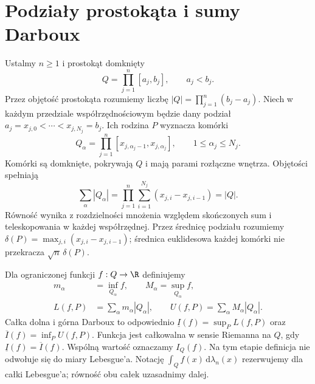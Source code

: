 \section{Podziały prostokąta i sumy Darboux}

Ustalmy $n\ge1$ i prostokąt domknięty
\[
 Q=\prod_{j=1}^n[a_j,b_j],\qquad a_j<b_j.
\]
Przez objętość prostokąta rozumiemy liczbę
$|Q|=\prod_{j=1}^n(b_j-a_j)$. Niech w każdym
przedziale współrzędnościowym będzie dany podział
$a_j=x_{j,0}<\cdots<x_{j,N_j}=b_j$.
Ich rodzina $P$ wyznacza komórki
\[
 Q_\alpha=\prod_{j=1}^n
 [x_{j,\alpha_j-1},x_{j,\alpha_j}],
 \qquad 1\le\alpha_j\le N_j.
\]
Komórki są domknięte, pokrywają $Q$ i mają parami
rozłączne wnętrza. Objętości spełniają
\[
 \sum_\alpha |Q_\alpha|
 =\prod_{j=1}^n
   \sum_{i=1}^{N_j}(x_{j,i}-x_{j,i-1})=|Q|.
\]
Równość wynika z rozdzielności mnożenia względem
skończonych sum i teleskopowania w każdej współrzędnej.
Przez średnicę podziału rozumiemy
$\delta(P)=\max_{j,i}(x_{j,i}-x_{j,i-1})$;
średnica euklidesowa każdej komórki nie przekracza
$\sqrt n\,\delta(P)$.

\begin{definicja}
\label{ma2:def:darboux-box}
Dla ograniczonej funkcji $f:Q\to\R$ definiujemy
\[
 \begin{aligned}
 m_\alpha&=\inf_{Q_\alpha}f,\qquad
 M_\alpha=\sup_{Q_\alpha}f,\\
 L(f,P)&=\sum_\alpha m_\alpha|Q_\alpha|,\qquad
 U(f,P)=\sum_\alpha M_\alpha|Q_\alpha|.
 \end{aligned}
\]
Całka dolna i górna Darboux to odpowiednio
$\underline I(f)=\sup_P L(f,P)$ oraz
$\overline I(f)=\inf_P U(f,P)$.
Funkcja jest całkowalna w sensie Riemanna na $Q$,
gdy $\underline I(f)=\overline I(f)$.
Wspólną wartość oznaczamy $I_Q(f)$.
Na tym etapie definicja nie odwołuje się do miary
Lebesgue'a. Notację $\int_Q f(x)\,\mathrm d\lambda_n(x)$
rezerwujemy dla całki Lebesgue'a; równość obu
całek uzasadnimy dalej.
\end{definicja}

